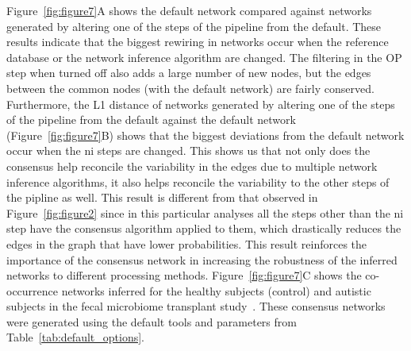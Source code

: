  Figure~\ref{fig:figure7}A shows the default network compared against networks generated by altering one of the steps of the pipeline from the default.
  These results indicate that the biggest rewiring in networks occur when the reference database or the network inference algorithm are changed.
  The filtering in the \ac{OP} step when turned off also adds a large number of new nodes, but the edges between the common nodes (with the default network) are fairly conserved.
  Furthermore, the L1 distance of networks generated by altering one of the steps of the pipeline from the default against the default network (Figure~\ref{fig:figure7}B) shows that the biggest deviations from the default network occur when the \ac{ni} steps are changed.
  This shows us that not only does the consensus help reconcile the variability in the edges due to multiple network inference algorithms, it also helps reconcile the variability to the other steps of the pipline as well.
  This result is different from that observed in Figure~\ref{fig:figure2} since in this particular analyses all the steps other than the \ac{ni} step have the consensus algorithm applied to them, which drastically reduces the edges in the graph that have lower probabilities.
  This result reinforces the importance of the consensus network in increasing the robustness of the inferred networks to different processing methods.
  Figure~\ref{fig:figure7}C shows the co-occurrence networks inferred for the healthy subjects (control) and autistic subjects in the fecal microbiome transplant study~\cite{Kang2017}.
  These consensus networks were generated using the default tools and parameters from Table~\ref{tab:default_options}.

